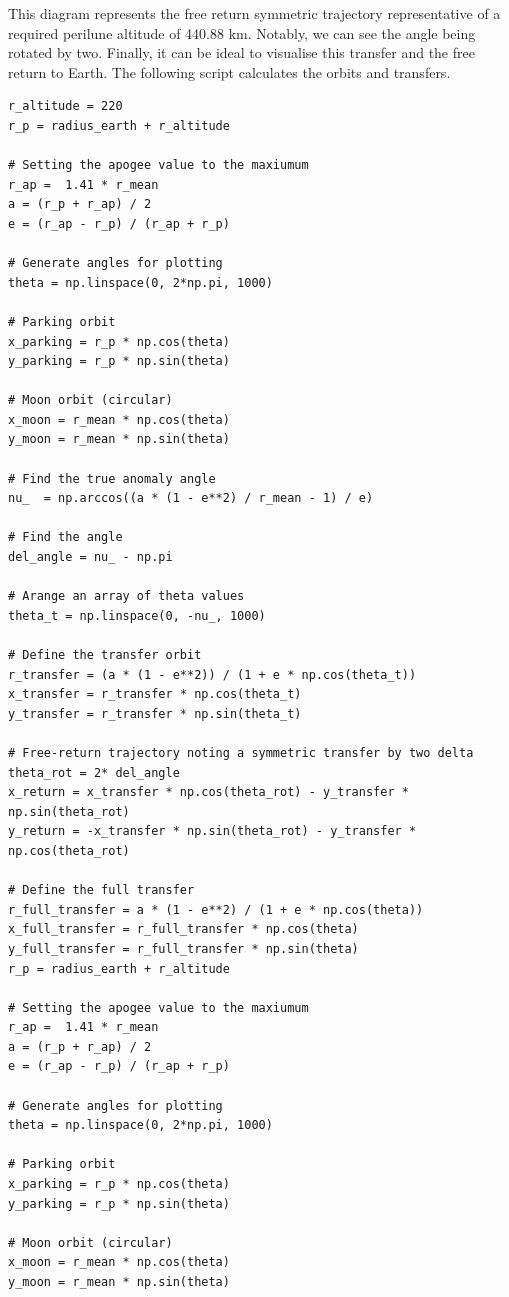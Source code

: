 \documentclass[12pt,twocolumn]{article}  %
\begin{document}
This diagram represents the free return 
symmetric trajectory representative of a 
required perilune altitude of 440.88 km.
Notably, we can 
see the angle being rotated by two.
\newline
\newline
\indent Finally, it can be ideal to visualise this transfer and the free return to Earth. The following script calculates the orbits and transfers. 

\begin{lstlisting}
r_altitude = 220
r_p = radius_earth + r_altitude

# Setting the apogee value to the maxiumum
r_ap =  1.41 * r_mean
a = (r_p + r_ap) / 2
e = (r_ap - r_p) / (r_ap + r_p)

# Generate angles for plotting
theta = np.linspace(0, 2*np.pi, 1000)

# Parking orbit 
x_parking = r_p * np.cos(theta)
y_parking = r_p * np.sin(theta)

# Moon orbit (circular)
x_moon = r_mean * np.cos(theta)
y_moon = r_mean * np.sin(theta)

# Find the true anomaly angle 
nu_  = np.arccos((a * (1 - e**2) / r_mean - 1) / e)

# Find the angle 
del_angle = nu_ - np.pi

# Arange an array of theta values
theta_t = np.linspace(0, -nu_, 1000)

# Define the transfer orbit
r_transfer = (a * (1 - e**2)) / (1 + e * np.cos(theta_t))
x_transfer = r_transfer * np.cos(theta_t)
y_transfer = r_transfer * np.sin(theta_t)

# Free-return trajectory noting a symmetric transfer by two delta
theta_rot = 2* del_angle
x_return = x_transfer * np.cos(theta_rot) - y_transfer * np.sin(theta_rot)
y_return = -x_transfer * np.sin(theta_rot) - y_transfer * np.cos(theta_rot)

# Define the full transfer 
r_full_transfer = a * (1 - e**2) / (1 + e * np.cos(theta))
x_full_transfer = r_full_transfer * np.cos(theta)
y_full_transfer = r_full_transfer * np.sin(theta)
r_p = radius_earth + r_altitude

# Setting the apogee value to the maxiumum
r_ap =  1.41 * r_mean
a = (r_p + r_ap) / 2
e = (r_ap - r_p) / (r_ap + r_p)

# Generate angles for plotting
theta = np.linspace(0, 2*np.pi, 1000)

# Parking orbit 
x_parking = r_p * np.cos(theta)
y_parking = r_p * np.sin(theta)

# Moon orbit (circular)
x_moon = r_mean * np.cos(theta)
y_moon = r_mean * np.sin(theta)


\end{lstlisting}
\end{document}
